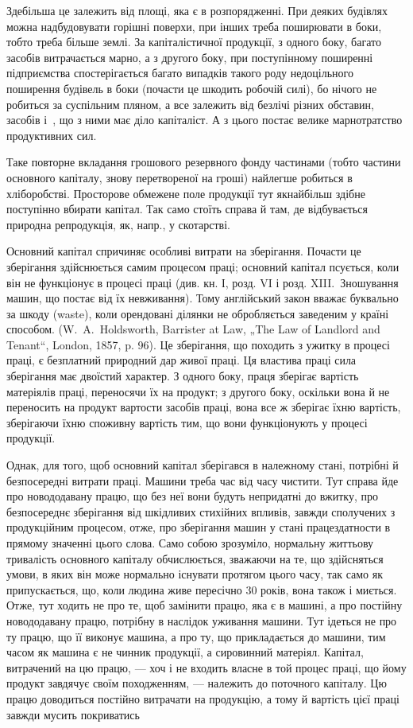 
Здебільша це залежить від площі, яка є в розпорядженні. При деяких будівлях можна надбудовувати
горішні поверхи, при інших треба поширювати в боки, тобто треба більше землі. За капіталістичної
продукції, з одного боку, багато засобів витрачається марно, а з другого боку, при поступінному
поширенні підприємства спостерігається багато випадків такого роду недоцільного поширення будівель в
боки (почасти це шкодить робочій силі), бо нічого не робиться за суспільним пляном, а все залежить
від безлічі різних обставин, засобів і~, що з ними має діло капіталіст. А з цього постає
велике марнотратство продуктивних сил.

Таке повторне вкладання грошового резервного фонду частинами (тобто частини основного капіталу,
знову перетвореної на гроші) найлегше робиться в хліборобстві. Просторове обмежене поле продукції
тут якнайбільш здібне поступінно вбирати капітал. Так само стоїть справа й там, де відбувається
природна репродукція, як, напр., у скотарстві.

Основний капітал спричиняє особливі витрати на зберігання. Почасти це зберігання здійснюється самим
процесом праці; основний капітал псується, коли він не функціонує в процесі праці (див. кн. І, розд.
VI і розд. XIII.~Зношування машин, що постає від їх невживання). Тому англійський закон вважає
буквально за шкоду (waste), коли орендовані ділянки не обробляється заведеним у країні способом. (W.~A.~Holdsworth, Barrister at Law, „The Law of Landlord and Tenant“, London, 1857, p. 96). Це
зберігання, що походить з ужитку в процесі праці, є безплатний природний дар живої праці. Ця
властива праці сила зберігання має двоїстий характер. З одного боку, праця зберігає вартість
матеріялів праці, переносячи їх на продукт; з другого боку, оскільки вона й не переносить на продукт
вартости засобів праці, вона все ж зберігає їхню вартість, зберігаючи їхню споживну вартість тим, що
вони функціонують у процесі продукції.

Однак, для того, щоб основний капітал зберігався в належному стані, потрібні й безпосередні витрати
праці. Машини треба час від часу чистити. Тут справа йде про новододавану працю, що без неї вони
будуть непридатні до вжитку, про безпосереднє зберігання від шкідливих стихійних впливів, завжди
сполучених з продукційним процесом, отже, про зберігання машин у стані працездатности в прямому
значенні цього слова. Само собою зрозуміло, нормальну життьову тривалість основного капіталу
обчислюється, зважаючи на те, що здійсняться умови, в яких він може нормально існувати протягом
цього часу, так само як припускається, що, коли людина живе пересічно 30 років, вона також і
миється. Отже, тут ходить не про те, щоб замінити працю, яка є в машині, а про постійну новододавану
працю, потрібну в наслідок уживання машини. Тут ідеться не про ту працю, що її виконує машина, а про
ту, що прикладається до машини, тим часом як машина є не чинник продукції, а сировинний
матеріял. Капітал, витрачений на цю працю, — хоч і не входить власне в той процес праці, що йому
продукт завдячує своїм походженням, — належить до поточного капіталу. Цю працю доводиться постійно
витрачати на продукцію, а тому й вартість цієї праці завжди мусить покриватись
\parbreak{}  %

